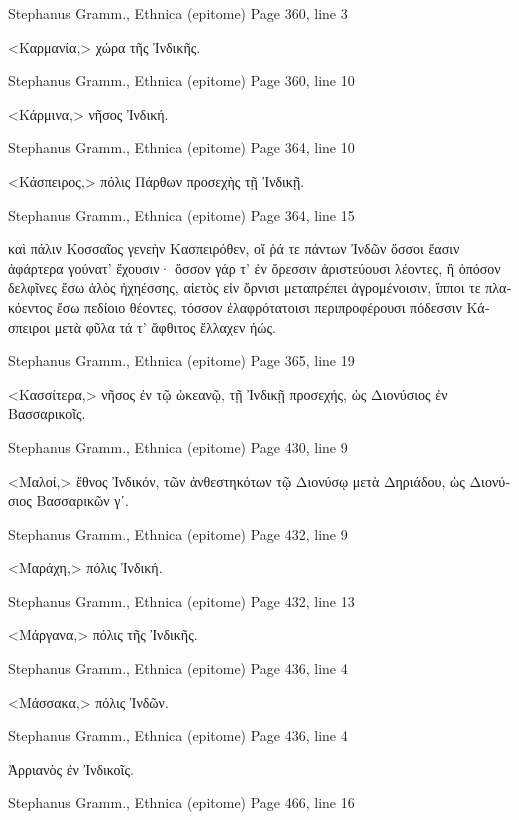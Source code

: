 \documentclass[12pt,letterpaper,twoside,final]{memoir}
\begin{document}
\begin{greek}
Stephanus Gramm., Ethnica (epitome) 
Page 360, line 3

<Καρμανία,> χώρα τῆς Ἰνδικῆς. 



Stephanus Gramm., Ethnica (epitome) 
Page 360, line 10

<Κάρμινα,> νῆσος Ἰνδική. 



Stephanus Gramm., Ethnica (epitome) 
Page 364, line 10

<Κάσπειρος,> πόλις Πάρθων προσεχὴς τῇ Ἰνδικῇ. 



Stephanus Gramm., Ethnica (epitome) 
Page 364, line 15

καὶ πάλιν 
  Κοσσαῖος γενεὴν Κασπειρόθεν, οἵ ῥά τε πάντων 
  Ἰνδῶν ὅσσοι ἔασιν ἀφάρτερα γούνατ' ἔχουσιν· 
  ὅσσον γάρ τ' ἐν ὄρεσσιν ἀριστεύουσι λέοντες, 
  ἢ ὁπόσον δελφῖνες ἔσω ἁλὸς ἠχηέσσης, 
  αἰετὸς εἰν ὄρνισι μεταπρέπει ἀγρομένοισιν, 
  ἵπποι τε πλακόεντος ἔσω πεδίοιο θέοντες, 
  τόσσον ἐλαφρότατοισι περιπροφέρουσι πόδεσσιν 
  Κάσπειροι μετὰ φῦλα τά τ' ἄφθιτος ἔλλαχεν ἠώς. 



Stephanus Gramm., Ethnica (epitome) 
Page 365, line 19

<Κασσίτερα,> νῆσος ἐν τῷ ὠκεανῷ, τῇ Ἰνδικῇ προσεχής, 
ὡς Διονύσιος ἐν Βασσαρικοῖς. 



Stephanus Gramm., Ethnica (epitome) 
Page 430, line 9

<Μαλοί,> ἔθνος Ἰνδικόν, τῶν ἀνθεστηκότων τῷ Διονύσῳ 
μετὰ Δηριάδου, ὡς Διονύσιος Βασσαρικῶν γʹ. 



Stephanus Gramm., Ethnica (epitome) 
Page 432, line 9

<Μαράχη,> πόλις Ἰνδική. 



Stephanus Gramm., Ethnica (epitome) 
Page 432, line 13

<Μάργανα,> πόλις τῆς Ἰνδικῆς. 



Stephanus Gramm., Ethnica (epitome) 
Page 436, line 4

<Μάσσακα,> πόλις Ἰνδῶν. 



Stephanus Gramm., Ethnica (epitome) 
Page 436, line 4

                                   Ἀρριανὸς ἐν Ἰνδικοῖς. 



Stephanus Gramm., Ethnica (epitome) 
Page 466, line 16


\end{greek}
\end{document}
